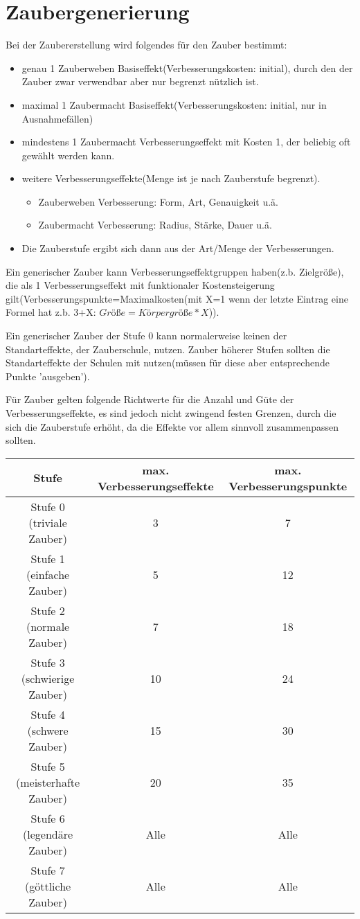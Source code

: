 \section{Zaubergenerierung}
Bei der Zaubererstellung wird folgendes für den Zauber bestimmt:
\begin{itemize}
\item genau 1 Zauberweben Basiseffekt(Verbesserungskosten: initial), durch den der Zauber zwar verwendbar aber nur begrenzt nützlich ist.
\item maximal 1 Zaubermacht Basiseffekt(Verbesserungskosten: initial, nur in Ausnahmefällen)
\item mindestens 1 Zaubermacht Verbesserungseffekt mit Kosten 1, der beliebig oft gewählt werden kann.
\item weitere Verbesserungseffekte(Menge ist je nach Zauberstufe begrenzt).
\begin{itemize}
\item Zauberweben Verbesserung: Form, Art, Genauigkeit u.ä.
\item Zaubermacht Verbesserung: Radius, Stärke, Dauer u.ä.
\end{itemize}
\item Die Zauberstufe ergibt sich dann aus der Art/Menge der Verbesserungen.
\end{itemize}
Ein generischer Zauber kann Verbesserungseffektgruppen haben(z.b. Zielgröße), die als 1 Verbesserungseffekt mit funktionaler Kostensteigerung gilt(Verbesserungspunkte=Maximalkosten(mit X=1 wenn der letzte Eintrag eine Formel hat z.b. 3+X: $Größe=Körpergröße*X$)).

Ein generischer Zauber der Stufe 0 kann normalerweise keinen der Standarteffekte, der Zauberschule, nutzen.
Zauber höherer Stufen sollten die Standarteffekte der Schulen mit nutzen(müssen für diese aber entsprechende Punkte 'ausgeben').

Für Zauber gelten folgende Richtwerte für die Anzahl und Güte der Verbesserungseffekte, es sind jedoch nicht zwingend festen Grenzen, durch die sich die Zauberstufe erhöht, da die Effekte vor allem sinnvoll zusammenpassen sollten.
\begin{tabulary}{\textwidth}{|C|C|C|}
\hline 
Stufe & max. Verbesserungseffekte & max. Verbesserungspunkte\\ 
\hline
Stufe 0 (triviale Zauber)&3&7\\
\hline 
Stufe 1 (einfache Zauber)&5&12\\
\hline 
Stufe 2 (normale Zauber)&7&18\\
\hline 
Stufe 3 (schwierige Zauber)&10&24\\
\hline 
Stufe 4 (schwere Zauber)&15&30\\
\hline 
Stufe 5 (meisterhafte Zauber)&20&35\\
\hline 
Stufe 6 (legendäre Zauber)&Alle&Alle\\
\hline 
Stufe 7 (göttliche Zauber)&Alle&Alle\\
\hline 
\end{tabulary}

